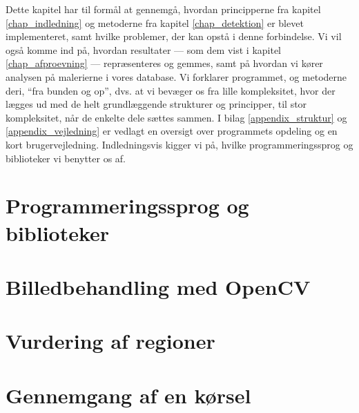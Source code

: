 {
{\sffamily Dette kapitel har til formål at gennemgå, hvordan
principperne fra kapitel \ref{chap_indledning} og metoderne fra kapitel
\ref{chap_detektion} er blevet implementeret, samt hvilke problemer, der
kan opstå i denne forbindelse. Vi vil også komme ind på, hvordan
resultater --- som dem vist i kapitel \ref{chap_afproevning} ---
repræsenteres og gemmes, samt på hvordan vi kører analysen på malerierne
i vores database.  Vi forklarer programmet, og metoderne deri, ``fra
bunden og op'', dvs. at vi bevæger os fra lille kompleksitet, hvor der
lægges ud med de helt grundlæggende strukturer og principper, til stor
kompleksitet, når de enkelte dele sættes sammen.  I bilag
\ref{appendix_struktur} og \ref{appendix_vejledning} er vedlagt en
oversigt over programmets opdeling og en kort brugervejledning.
Indledningsvis kigger vi på, hvilke programmeringssprog og biblioteker
vi benytter os af.
}

\section{Programmeringssprog og biblioteker\label{section_programmeringssprog}}


\section{Billedbehandling med OpenCV\label{section_impBilledbehandling}}


\section{Vurdering af regioner\label{section_vurdering_regioner}}


\section{Gennemgang af en kørsel\label{section_koersel}}


%

}

